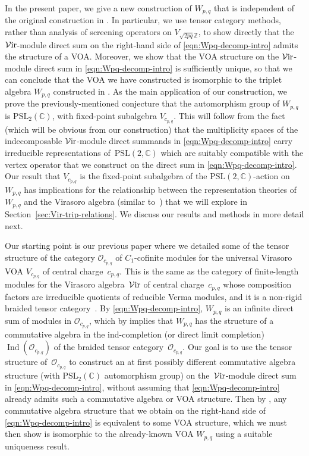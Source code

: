 \documentclass[pdftex]{sigma}
\numberwithin{equation}{section}
\theoremstyle{definition}
\begin{document}
 In the present paper, we give a new construction of $W_{p,q}$ that is independent of the original construction in \cite{FGST1-Log}. In particular, we use tensor category methods, rather than analysis of screening operators on $V_{\sqrt{2pq}\mathbb{Z}}$, to show directly that the $\mathcal{V}{\rm ir}$-module direct sum on the right-hand side of \eqref{eqn:Wpq-decomp-intro} admits the structure of a VOA. Moreover, we show that the VOA structure on the $\mathcal{V}{\rm ir}$-module direct sum in \eqref{eqn:Wpq-decomp-intro} is
sufficiently unique, so that we can conclude that the VOA we have constructed is isomorphic to the triplet algebra $W_{p,q}$ constructed in \cite{FGST1-Log}. As the main application of our construction, we prove the previously-mentioned conjecture that the automorphism group of $W_{p,q}$ is $\mathrm{PSL}_2(\mathbb{C})$, with fixed-point subalgebra $V_{c_{p,q}}$. This will follow from the fact (which will be obvious from our construction) that the multiplicity spaces of the indecomposable $\mathcal{V}{\rm ir}$-module direct summands in \eqref{eqn:Wpq-decomp-intro} carry irreducible representations of~$\mathrm{PSL}(2,\mathbb{C})$ which are suitably compatible with the vertex operator that we construct on the direct sum in \eqref{eqn:Wpq-decomp-intro}. Our result that $V_{c_{p,q}}$ is the fixed-point subalgebra of the $\mathrm{PSL}(2,\mathbb{C})$-action on~$W_{p,q}$ has implications for the relationship between the representation theories of~$W_{p,q}$ and the Virasoro algebra (similar to~\cite{McR-G-equiv}) that we will explore in Section~\ref{sec:Vir-trip-relations}. We discuss our results and methods in more detail next.

Our starting point is our previous paper \cite{MS-cpq-Vir} where we detailed some of the tensor structure of the category $\mathcal{O}_{c_{p,q}}$ of $C_1$-cofinite modules for the universal Virasoro VOA $V_{c_{p,q}}$ of central charge~$c_{p,q}$. This is the same as the category of finite-length modules for the Virasoro algebra~$\mathcal{V}{\rm ir}$ of central charge~$c_{p,q}$ whose composition factors are irreducible quotients of reducible Verma modules, and it is a non-rigid braided tensor category~\cite{CJORY}.
By \eqref{eqn:Wpq-decomp-intro}, $W_{p,q}$ is an infinite direct sum of modules in $\mathcal{O}_{c_{p,q}}$, which by \cite{CMY1,HKL} implies that $W_{p,q}$ has the structure of a commutative algebra in the ind-completion (or direct limit completion) $\operatorname{Ind}(\mathcal{O}_{c_{p,q}})$ of the braided tensor category~$\mathcal{O}_{c_{p,q}}$.
Our goal is to use the tensor structure of~$\mathcal{O}_{c_{p,q}}$ to construct an at first possibly different commutative algebra structure (with $\mathrm{PSL}_2(\mathbb{C})$ automorphism group) on the~$\mathcal{V}{\rm ir}$-module direct sum in \eqref{eqn:Wpq-decomp-intro}, without assuming that \eqref{eqn:Wpq-decomp-intro} already admits such a commutative algebra or VOA structure. Then by \cite{HKL}, any commutative algebra structure that we obtain on the right-hand side of \eqref{eqn:Wpq-decomp-intro} is equivalent to some VOA structure, which we must then show is isomorphic to the already-known VOA $W_{p,q}$ using a suitable uniqueness result.
\end{document}
